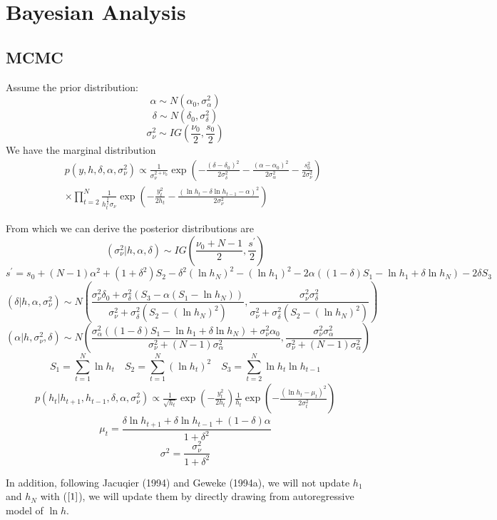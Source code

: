 \documentclass{article}
\begin{document}
\section{Bayesian Analysis}
\subsection{MCMC}
Assume the prior distribution:
\[
\alpha\sim N(\alpha_0,\sigma_\alpha^2)
\]
\[
\delta\sim N(\delta_0,\sigma_\delta^2)
\]
\[
\sigma_\nu^2\sim IG(\frac{\nu_0}{2},\frac{s_0}{2})
\]
We have the marginal distribution
\begin{eqnarray}
&&p(y,h,\delta,\alpha,\sigma_\nu^2)\propto\frac{1}{\sigma_\nu^{2+\nu_0}}\exp\left(-\frac{(\delta-\delta_0)^2}{2\sigma_\delta^2}-\frac{(\alpha-\alpha_0)^2}{2\sigma_\alpha^2}-\frac{s_0^2}{2\sigma_\nu^2}\right)\nonumber\\
&&\times\prod_{t=2}^{N}\frac{1}{h_t^{\frac{3}{2}}\sigma_\nu}\exp\left(-\frac{y_t^2}{2h_t}-\frac{(\ln h_t-\delta\ln h_{t-1}-\alpha)^2}{2\sigma^2_\nu}\right)
\end{eqnarray}

From which we can derive the posterior distributions are
\[
(\sigma_\nu^2|h,\alpha,\delta)\sim IG\left(\frac{\nu_0+N-1}{2},\frac{s^\prime}{2}\right)
\]
\[
s^\prime=s_0+(N-1)\alpha^2+(1+\delta^2)S_2-\delta^2(\ln h_N)^2-(\ln h_1)^2-2\alpha((1-\delta)S_1-\ln h_1+\delta\ln h_N)-2\delta S_3
\]
\[
(\delta|h,\alpha,\sigma_\nu^2)\sim N\left(\frac{\sigma_\nu^2\delta_0+\sigma_\delta^2(S_3-\alpha(S_1-\ln h_N))}{\sigma_\nu^2+\sigma_\delta^2(S_2-(\ln h_N)^2)},\frac{\sigma_\nu^2\sigma_\delta^2}{\sigma_\nu^2+\sigma_\delta^2(S_2-(\ln h_N)^2)}\right)
\]
\[
(\alpha|h,\sigma_\nu^2,\delta)\sim N\left(\frac{\sigma_\alpha^2((1-\delta)S_1-\ln h_1+\delta\ln h_N)+\sigma_\nu^2\alpha_0}{\sigma_\nu^2+(N-1)\sigma_\alpha^2},\frac{\sigma_\nu^2\sigma_\alpha^2}{\sigma_\nu^2+(N-1)\sigma_\alpha^2}\right)
\]
\[
S_1=\sum_{t=1}^N\ln h_t\quad S_2=\sum_{t=1}^N(\ln h_t)^2\quad S_3=\sum_{t=2}^N \ln h_t\ln h_{t-1}
\]
\begin{eqnarray}\label{1}
p(h_t|h_{t+1},h_{t-1},\delta,\alpha,\sigma_\nu^2)\propto\frac{1}{\sqrt{h_t}}\exp\left(-\frac{y_t^2}{2h_t}\right)\frac{1}{h_t}\exp\left(-\frac{(\ln h_t-\mu_t)^2}{2\sigma_t^2}\right)
\end{eqnarray}
\[
\mu_t=\frac{\delta\ln h_{t+1}+\delta\ln h_{t-1}+(1-\delta)\alpha}{1+\delta^2}
\]
\[
\sigma^2=\frac{\sigma_\nu^2}{1+\delta^2}
\]

In addition, following Jacuqier (1994) and Geweke (1994a), we will not update $h_1$ and $h_N$ with ($\ref{1}$), we will update them by directly drawing from autoregressive model of $\ln h$.
\end{document}
